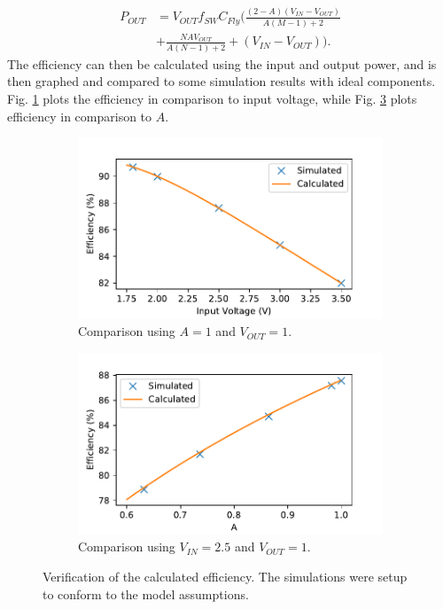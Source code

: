 \documentclass[conference]{IEEEtran}
\begin{document}
 	\begin{equation}
 	\begin{split}
 	P_{OUT} &= V_{OUT}f_{SW}C_{Fly}\Big(\tfrac{(2-A)(V_{IN} - V_{OUT})}{A(M-1) + 2} \\ 
 	&+ \tfrac{NAV_{OUT}}{A(N-1) + 2} + (V_{IN} - V_{OUT})\Big).
 	\end{split} 	
 	\label{eq:P_OUT}
 	\end{equation}
 	The efficiency can then be calculated using the input and output power, and is then graphed and compared to some simulation results with ideal components. Fig. \ref{fig:Comp_VIn} plots the efficiency in comparison to input voltage, while Fig. \ref{fig:Comp_A} plots efficiency in comparison to $A$.
 	
 	\begin{figure}
 		\centering
 		\begin{subfigure}{0.4\textwidth}
 			\centering
 			\includegraphics[width=\linewidth]{Figures/eta_VIn.pdf}
 			\caption{Comparison using $A = 1$ and $V_{OUT} = 1$.}
 			\label{fig:Comp_VIn}
 		\end{subfigure}
 	\begin{subfigure}{0.4\textwidth}
 		\includegraphics[width=\linewidth]{Figures/eta_A.pdf}
 		\caption{Comparison using $V_{IN} = 2.5$ and $V_{OUT} = 1$.}
 		\label{fig:Comp_A}
 	\end{subfigure}
 		\caption{Verification of the calculated efficiency. The simulations were setup to conform to the model assumptions.}
 	\end{figure}
\end{document}
